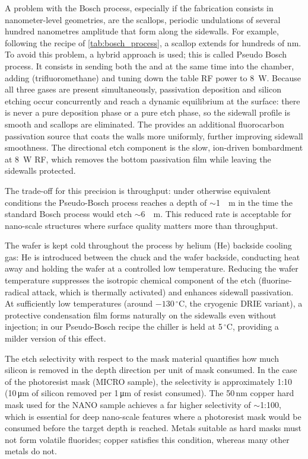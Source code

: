 \begin{itemize}
    A problem with the Bosch process, especially if the fabrication consists in
    nanometer-level geometries, are the scallops, periodic undulations of
    several hundred nanometres amplitude that form along the sidewalls.
    For example, following the recipe of \cref{tab:bosch_process}, a scallop
    extends for hundreds of \si{\nano \meter}. To avoid this problem,
    a hybrid approach is used; this is called Pseudo Bosch process.
    It consists in sending both the  and  at the
    same time into the chamber, adding  (trifluoromethane) and
    tuning down the table RF power to \SI{8}{\watt}. Because all three gases
    are present simultaneously, passivation deposition and silicon etching occur
    concurrently and reach a dynamic equilibrium at the surface: there is never
    a pure deposition phase or a pure etch phase, so the sidewall profile is
    smooth and scallops are eliminated. The  provides an additional
    fluorocarbon passivation source that coats the walls more uniformly,
    further improving sidewall smoothness. The directional etch component is
    the slow, ion-driven bombardment at \SI{8}{\watt} RF, which removes the
    bottom passivation film while leaving the sidewalls protected.

    The trade-off for this precision is throughput: under otherwise equivalent
    conditions the Pseudo-Bosch process reaches a depth of $\sim$\SI{1}{\micro
    \meter} in the time the standard Bosch process would etch $\sim$\SI{6}{\micro
    \meter}. This reduced rate is acceptable for nano-scale structures where
    surface quality matters more than throughput.

    The wafer is kept cold throughout the process by helium (He) backside
    cooling gas: He is introduced between the chuck and the wafer backside,
    conducting heat away and holding the wafer at a controlled low temperature.
    Reducing the wafer temperature suppresses the isotropic chemical component
    of the etch (fluorine-radical attack, which is thermally activated) and
    enhances sidewall passivation. At sufficiently low temperatures
    (around $-130\,^\circ$C, the cryogenic DRIE variant), a protective
    condensation film forms naturally on the sidewalls even without 
    injection; in our Pseudo-Bosch recipe the chiller is held at 5\,$^\circ$C,
    providing a milder version of this effect.

    The etch selectivity with respect to the mask material quantifies
    how much silicon is removed in the depth direction per unit of mask
    consumed. In the case of the
    photoresist mask (MICRO sample), the selectivity is approximately 1:10
    (10\,\si{\micro\meter} of silicon removed per 1\,\si{\micro\meter} of
    resist consumed). The 50\,nm copper hard mask used for the NANO sample
    achieves a far higher selectivity of $\sim$1:100, which is essential for
    deep nano-scale features where a photoresist mask would be consumed before
    the target depth is reached. Metals suitable as hard masks must not form
    volatile fluorides; copper satisfies this condition, whereas many other
    metals do not.


\end{itemize}
